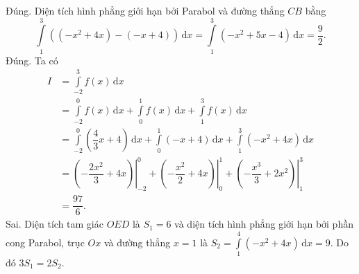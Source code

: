 \begin{ex}
{\begin{itemchoice}
		\itemch Đúng. Diện tích hình phẳng giới hạn bởi Parabol và đường thẳng $CB$ bằng
		$$\displaystyle\int\limits_1^3\left((-x^2+4x)-(-x+4)\right)\mathrm{\, d}x=\displaystyle\int\limits_1^3\left(-x^2+5x-4\right)\mathrm{\, d}x=\dfrac{9}{2}.$$
		\itemch Đúng. Ta có
		{\allowdisplaybreaks
			\begin{align*}
				I&=\displaystyle\int\limits_{-2}^3 f(x)\mathrm{\,d}x\\
				&=\displaystyle\int\limits_{-2}^0 f(x)\mathrm{\,d}x+\displaystyle\int\limits_0^1 f(x)\mathrm{\,d}x+\displaystyle\int\limits_1^3 f(x)\mathrm{\,d}x\\
				&=\displaystyle\int\limits_{-2}^0 \left(\dfrac{4}{3}x+4\right)\mathrm{\,d}x+\displaystyle\int\limits_0^1 (-x+4)\mathrm{\,d}x+\displaystyle\int\limits_1^3 (-x^2+4x)\mathrm{\,d}x\\
				&=\left.\left(-\dfrac{2x^2}{3}+4x\right)\right|_{-2}^0+\left.\left(-\dfrac{x^2}{2}+4x\right)\right|_0^1+\left.\left(-\dfrac{x^3}{3}+2x^2\right)\right|_1^3\\
				&=\dfrac{97}{6}.
		\end{align*}}
		\itemch Sai. Diện tích tam giác $OED$ là $S_1=6$ và diện tích hình phẳng giới hạn bởi phần cong Parabol, trục $Ox$ và đường thẳng $x=1$ là $S_2=\displaystyle\int\limits_1^4(-x^2+4x)\mathrm{\, d}x=9$. Do đó $3S_1=2S_2$.
	\end{itemchoice}
	}
\end{ex}
